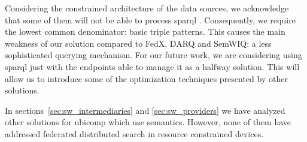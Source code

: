 Considering the constrained architecture of the data sources, we acknowledge that some of them will not be able to process \acs{sparql} .
Consequently, we require the lowest common denominator: basic triple patterns.
This causes the main weakness of our solution compared to FedX, DARQ and SemWIQ: a less sophisticated querying mechanism.
For our future work, we are considering using \acs{sparql} just with the endpoints able to manage it as a halfway solution.
This will allow us to introduce some of the optimization techniques presented by other solutions.


\bigskip


In sections~\ref{sec:sw_intermediaries} and \ref{sec:sw_providers} we have analyzed other solutions for \ac{ubicomp} which use semantics.
However, none of them have addressed federated distributed search in resource constrained devices.












